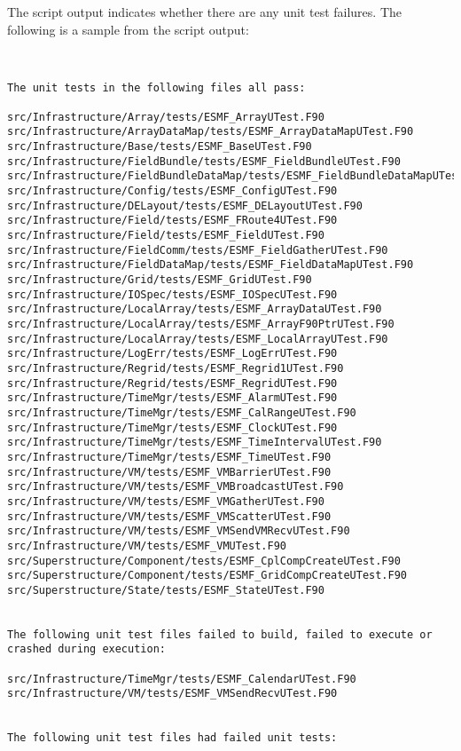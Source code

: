 The script output indicates whether there are any unit test failures.
The following is a sample from the script output:

\begin{verbatim}


The unit tests in the following files all pass:

src/Infrastructure/Array/tests/ESMF_ArrayUTest.F90
src/Infrastructure/ArrayDataMap/tests/ESMF_ArrayDataMapUTest.F90
src/Infrastructure/Base/tests/ESMF_BaseUTest.F90
src/Infrastructure/FieldBundle/tests/ESMF_FieldBundleUTest.F90
src/Infrastructure/FieldBundleDataMap/tests/ESMF_FieldBundleDataMapUTest.F90
src/Infrastructure/Config/tests/ESMF_ConfigUTest.F90
src/Infrastructure/DELayout/tests/ESMF_DELayoutUTest.F90
src/Infrastructure/Field/tests/ESMF_FRoute4UTest.F90
src/Infrastructure/Field/tests/ESMF_FieldUTest.F90
src/Infrastructure/FieldComm/tests/ESMF_FieldGatherUTest.F90
src/Infrastructure/FieldDataMap/tests/ESMF_FieldDataMapUTest.F90
src/Infrastructure/Grid/tests/ESMF_GridUTest.F90
src/Infrastructure/IOSpec/tests/ESMF_IOSpecUTest.F90
src/Infrastructure/LocalArray/tests/ESMF_ArrayDataUTest.F90
src/Infrastructure/LocalArray/tests/ESMF_ArrayF90PtrUTest.F90
src/Infrastructure/LocalArray/tests/ESMF_LocalArrayUTest.F90
src/Infrastructure/LogErr/tests/ESMF_LogErrUTest.F90
src/Infrastructure/Regrid/tests/ESMF_Regrid1UTest.F90
src/Infrastructure/Regrid/tests/ESMF_RegridUTest.F90
src/Infrastructure/TimeMgr/tests/ESMF_AlarmUTest.F90
src/Infrastructure/TimeMgr/tests/ESMF_CalRangeUTest.F90
src/Infrastructure/TimeMgr/tests/ESMF_ClockUTest.F90
src/Infrastructure/TimeMgr/tests/ESMF_TimeIntervalUTest.F90
src/Infrastructure/TimeMgr/tests/ESMF_TimeUTest.F90
src/Infrastructure/VM/tests/ESMF_VMBarrierUTest.F90
src/Infrastructure/VM/tests/ESMF_VMBroadcastUTest.F90
src/Infrastructure/VM/tests/ESMF_VMGatherUTest.F90
src/Infrastructure/VM/tests/ESMF_VMScatterUTest.F90
src/Infrastructure/VM/tests/ESMF_VMSendVMRecvUTest.F90
src/Infrastructure/VM/tests/ESMF_VMUTest.F90
src/Superstructure/Component/tests/ESMF_CplCompCreateUTest.F90
src/Superstructure/Component/tests/ESMF_GridCompCreateUTest.F90
src/Superstructure/State/tests/ESMF_StateUTest.F90


The following unit test files failed to build, failed to execute or crashed during execution:

src/Infrastructure/TimeMgr/tests/ESMF_CalendarUTest.F90
src/Infrastructure/VM/tests/ESMF_VMSendRecvUTest.F90


The following unit test files had failed unit tests:


\end{verbatim}
